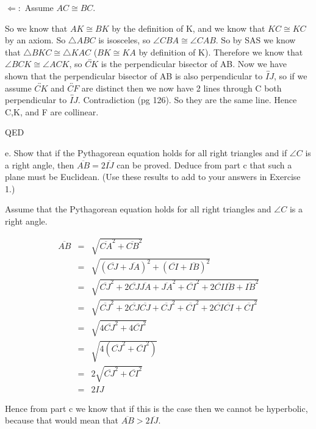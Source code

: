 \documentclass[12pt,letterpaper]{article}
\newcommand{\QED}{\begin{flushright}QED\end{flushright}}
\begin{document}
$\Leftarrow:$  Assume $AC \cong BC$.  

So we know that $AK \cong BK$ by the definition of K, and we know that $KC \cong KC$ by an axiom. So $\triangle ABC$ is isosceles, so $\angle CBA \cong \angle CAB$.  So by SAS we know that $\triangle BKC \cong \triangle KAC$ ($BK \cong KA$ by definition of K).  Therefore we know that $\angle BCK \cong \angle ACK$, so $\overleftrightarrow{CK}$ is the perpendicular bisector of AB. Now we have shown that the perpendicular bisector of AB is also perpendicular to $\overleftrightarrow{IJ}$, so if we assume $\overleftrightarrow{CK}$ and $\overleftrightarrow{CF}$ are distinct then we now have 2 lines through C both perpendicular to $\overleftrightarrow{IJ}$.  Contradiction (pg 126).  So they are the same line.  Hence C,K, and F are collinear. 


\QED







\newpage 

e. Show that if the Pythagorean equation holds for all right triangles and if $\angle C$ is a right angle, then $\overline{AB} = 2\overline{IJ}$ can be proved.  Deduce from part c that such a plane must be Euclidean.  (Use these results to add to your answers in Exercise 1.)

Assume that the Pythagorean equation holds for all right triangles and $\angle C$ is a right angle.

\begin{eqnarray*}
\overline{AB} &=& \sqrt{\overline{CA}^2 + \overline{CB}^2}\\
&=& \sqrt{(\overline{CJ} + \overline{JA})^2 + (\overline{CI} + \overline{IB})^2}\\
&=& \sqrt{\overline{CJ}^2 + 2\overline{CJ} \overline{JA} + \overline{JA}^2 +\overline{CI}^2 + 2\overline{CI} \overline{IB} + \overline{IB}^2}\\
&=& \sqrt{\overline{CJ}^2 + 2\overline{CJ} \overline{CJ} + \overline{CJ}^2 +\overline{CI}^2 + 2\overline{CI} \overline{CI} + \overline{CI}^2}\\
&=& \sqrt{4\overline{CJ}^2 + 4\overline{CI}^2}\\
&=& \sqrt{4(\overline{CJ}^2 + \overline{CI}^2)}\\
&=& 2\sqrt{\overline{CJ}^2 + \overline{CI}^2}\\
&=& 2 IJ
\end{eqnarray*}


Hence from part c we know that if this is the case then we cannot be hyperbolic, because that would mean that $\overline{AB} > 2\overline{IJ}$.
\end{document}
